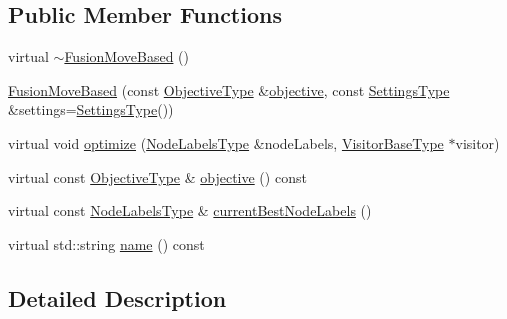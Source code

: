 \subsection*{Public Member Functions}
\begin{DoxyCompactItemize}
\item 
virtual \hyperlink{classnifty_1_1graph_1_1opt_1_1lifted__multicut_1_1FusionMoveBased_a50528e41d9d8c9aa77de0f6817a2953d}{$\sim$\+Fusion\+Move\+Based} ()
\item 
\hyperlink{classnifty_1_1graph_1_1opt_1_1lifted__multicut_1_1FusionMoveBased_a49146d9a1cd733a8be59866435a1b75e}{Fusion\+Move\+Based} (const \hyperlink{classnifty_1_1graph_1_1opt_1_1lifted__multicut_1_1FusionMoveBased_a9cb2fb9caff3dac87f0d43cf757e676c}{Objective\+Type} \&\hyperlink{classnifty_1_1graph_1_1opt_1_1lifted__multicut_1_1FusionMoveBased_a77ddf30aa1d4ac905b853aaeee5adc00}{objective}, const \hyperlink{structnifty_1_1graph_1_1opt_1_1lifted__multicut_1_1FusionMoveBased_1_1SettingsType}{Settings\+Type} \&settings=\hyperlink{structnifty_1_1graph_1_1opt_1_1lifted__multicut_1_1FusionMoveBased_1_1SettingsType}{Settings\+Type}())
\item 
virtual void \hyperlink{classnifty_1_1graph_1_1opt_1_1lifted__multicut_1_1FusionMoveBased_ac637f35b00a9125597adee3d1a88b3d1}{optimize} (\hyperlink{classnifty_1_1graph_1_1opt_1_1lifted__multicut_1_1FusionMoveBased_a927c0df1d813436185e85af1714f1fbe}{Node\+Labels\+Type} \&node\+Labels, \hyperlink{classnifty_1_1graph_1_1opt_1_1lifted__multicut_1_1FusionMoveBased_af4920e3b541fb9b40fb17c4a73f500b5}{Visitor\+Base\+Type} $\ast$visitor)
\item 
virtual const \hyperlink{classnifty_1_1graph_1_1opt_1_1lifted__multicut_1_1FusionMoveBased_a9cb2fb9caff3dac87f0d43cf757e676c}{Objective\+Type} \& \hyperlink{classnifty_1_1graph_1_1opt_1_1lifted__multicut_1_1FusionMoveBased_a77ddf30aa1d4ac905b853aaeee5adc00}{objective} () const
\item 
virtual const \hyperlink{classnifty_1_1graph_1_1opt_1_1lifted__multicut_1_1FusionMoveBased_a927c0df1d813436185e85af1714f1fbe}{Node\+Labels\+Type} \& \hyperlink{classnifty_1_1graph_1_1opt_1_1lifted__multicut_1_1FusionMoveBased_ad9b947c6c21ec27063ca08f5a5671d90}{current\+Best\+Node\+Labels} ()
\item 
virtual std\+::string \hyperlink{classnifty_1_1graph_1_1opt_1_1lifted__multicut_1_1FusionMoveBased_a648df4882bea393bd28adce4d0c2defa}{name} () const
\end{DoxyCompactItemize}


\subsection{Detailed Description}
